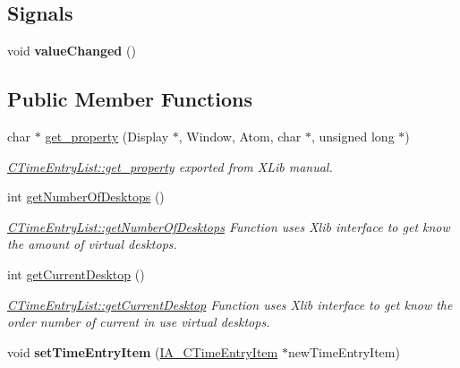 \subsection*{Signals}
\begin{DoxyCompactItemize}
\item 
\mbox{\label{classCTimeEntryList_aa8867a959c32a552fba7ef224acfa078}} 
void {\bfseries value\+Changed} ()
\end{DoxyCompactItemize}
\subsection*{Public Member Functions}
\begin{DoxyCompactItemize}
\item 
char $\ast$ \hyperlink{classCTimeEntryList_a3c69293ae26634d1889e0bd8730926ae}{get\+\_\+property} (Display $\ast$, Window, Atom, char $\ast$, unsigned long $\ast$)
\begin{DoxyCompactList}\small\item\em \hyperlink{classCTimeEntryList_a3c69293ae26634d1889e0bd8730926ae}{C\+Time\+Entry\+List\+::get\+\_\+property} exported from X\+Lib manual. \end{DoxyCompactList}\item 
int \hyperlink{classCTimeEntryList_a77da074f7eafb033dd6e85f1859b283e}{get\+Number\+Of\+Desktops} ()
\begin{DoxyCompactList}\small\item\em \hyperlink{classCTimeEntryList_a77da074f7eafb033dd6e85f1859b283e}{C\+Time\+Entry\+List\+::get\+Number\+Of\+Desktops} Function uses Xlib interface to get know the amount of virtual desktops. \end{DoxyCompactList}\item 
int \hyperlink{classCTimeEntryList_a20719d5a02fbabea219f8f05be9e9791}{get\+Current\+Desktop} ()
\begin{DoxyCompactList}\small\item\em \hyperlink{classCTimeEntryList_a20719d5a02fbabea219f8f05be9e9791}{C\+Time\+Entry\+List\+::get\+Current\+Desktop} Function uses Xlib interface to get know the order number of current in use virtual desktops. \end{DoxyCompactList}\item 
\mbox{\label{classCTimeEntryList_a80f2cc219a97436e47351195b429027c}} 
void {\bfseries set\+Time\+Entry\+Item} (\hyperlink{classIA__CTimeEntryItem}{I\+A\+\_\+\+C\+Time\+Entry\+Item} $\ast$new\+Time\+Entry\+Item)

\end{DoxyCompactItemize}
